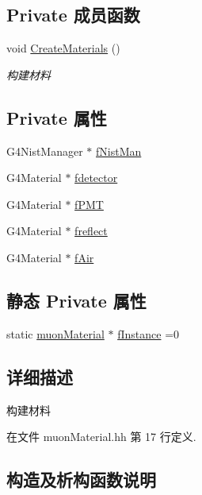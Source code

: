 \subsection*{Private 成员函数}
\begin{DoxyCompactItemize}
\item 
void \hyperlink{classmuonMaterial_a8a540dd90dc8252913e5dcb63d7f07b0}{Create\+Materials} ()
\begin{DoxyCompactList}\small\item\em 构建材料 \end{DoxyCompactList}\end{DoxyCompactItemize}
\subsection*{Private 属性}
\begin{DoxyCompactItemize}
\item 
G4\+Nist\+Manager $\ast$ \hyperlink{classmuonMaterial_a369d8b63868ac68fc917aa93cc321d17}{f\+Nist\+Man}
\item 
G4\+Material $\ast$ \hyperlink{classmuonMaterial_ae5df2e697057d4e3c7e22f1152942eb4}{fdetector}
\item 
G4\+Material $\ast$ \hyperlink{classmuonMaterial_a91b124a58e862152b3a04317d3ca8cbc}{f\+P\+MT}
\item 
G4\+Material $\ast$ \hyperlink{classmuonMaterial_a62687d2a8459169ed8c79aaedaf9013d}{freflect}
\item 
G4\+Material $\ast$ \hyperlink{classmuonMaterial_aad484f194b194516ad00b9c263345639}{f\+Air}
\end{DoxyCompactItemize}
\subsection*{静态 Private 属性}
\begin{DoxyCompactItemize}
\item 
static \hyperlink{classmuonMaterial}{muon\+Material} $\ast$ \hyperlink{classmuonMaterial_a930e3601f3476643cc24db541f6ea253}{f\+Instance} =0
\end{DoxyCompactItemize}


\subsection{详细描述}
构建材料 

在文件 muon\+Material.\+hh 第 17 行定义.



\subsection{构造及析构函数说明}
\mbox{\label{classmuonMaterial_ae18416f718e33ca4a8bf12b11fe7d4cf}} 
